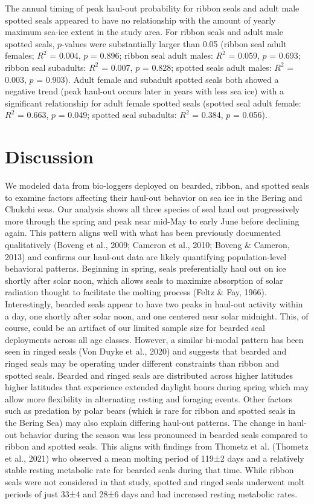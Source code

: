 \documentclass[fleqn,10pt,lineno]{wlpeerj} %
\begin{document}
The annual timing of peak haul-out probability for ribbon seals and adult
male spotted seals appeared to have
no relationship with the amount of yearly maximum sea-ice extent in the
study area. For ribbon seals and adult male spotted seals,
\(p\)-values were substantially larger than 0.05 (ribbon seal adult
females; \(R^{2}\) = 0.004, \(p\) = 0.896;
ribbon seal adult males: \(R^{2}\) = 0.059, \(p\) =
0.693; ribbon seal subadults: \(R^{2}\) =
0.007, \(p\) = 0.828; spotted seals
adult males: \(R^{2}\) = 0.003, \(p\) =
0.903). Adult female and subadult spotted seals both
showed a negative trend (peak haul-out occurs later in years with less
sea ice) with a significant relationship for adult female spotted seals
(spotted seal adult female: \(R^{2}\) =
0.663, \(p\) = 0.049; spotted seal
subadults: \(R^{2}\) = 0.384, \(p\) =
0.056).

\hypertarget{discussion}{%
\section*{Discussion}\label{discussion}}

We modeled data from bio-loggers deployed on bearded, ribbon, and spotted seals
to examine factors affecting their haul-out behavior on sea ice in the Bering
and Chukchi seas. Our analysis shows all three species of seal haul out
progressively more through the spring and peak near mid-May to early June before
declining again. This pattern aligns well with what has been previously
documented qualitatively (Boveng et al., 2009; Cameron et al., 2010; Boveng \& Cameron, 2013) and confirms
our haul-out data are likely quantifying population-level behavioral patterns.
Beginning in spring, seals preferentially haul out on ice shortly after solar
noon, which allows seals to maximize absorption of solar radiation thought to
facilitate the molting process (Feltz \& Fay, 1966). Interestingly, bearded seals appear
to have two peaks in haul-out activity within a day, one shortly after solar
noon, and one centered near solar midnight. This, of course, could be an
artifact of our limited sample size for bearded seal deployments across all age
classes. However, a similar bi-modal pattern has been seen in ringed seals
(Von Duyke et al., 2020) and suggests that bearded and ringed seals may be operating
under different constraints than ribbon and spotted seals. Bearded and ringed
seals are distributed across higher latitudes higher latitudes that experience
extended daylight hours during spring which may allow more flexibility in
alternating resting and foraging events. Other factors such as predation by
polar bears (which is rare for ribbon and spotted seals in the Bering Sea) may
also explain differing haul-out patterns. The change in haul-out behavior during
the season was less pronounced in bearded seals compared to ribbon and spotted
seals. This aligns with findings from Thometz et al. (Thometz et al., 2021) who observed
a mean molting period of 119±2 days and a relatively stable resting metabolic
rate for bearded seals during that time. While ribbon seals were not considered
in that study, spotted and ringed seals underwent molt periods of just 33±4
and 28±6 days and had increased resting metabolic rates.
\end{document}
